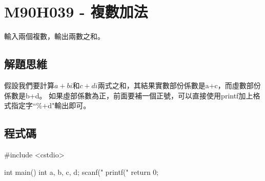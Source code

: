 \section{M90H039 - 複數加法}
輸入兩個複數，輸出兩數之和。

\subsection{解題思維}
假設我們要計算$a+bi$和$c+di$兩式之和，其結果實數部份係數是a+c，而虛數部份係數是b+d。
如果虛部係數為正，前面要補一個正號，可以直接使用printf加上格式指定字``\%+d"輸出即可。

\subsection{程式碼}
\begin{cppcode}
	#include <cstdio>
	
	int main()
	{
		int a, b, c, d;
		scanf("%
		printf("%
		return 0;
	}
\end{cppcode}
